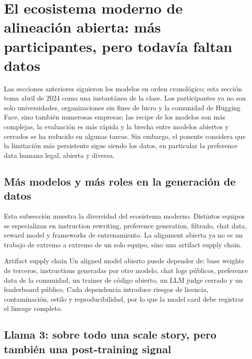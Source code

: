 \section{El ecosistema moderno de alineación abierta: más participantes, pero todavía faltan datos}

Las secciones anteriores siguieron los modelos en orden cronológico; esta sección toma abril de 2024 como una instantánea de la clase. Los participantes ya no son solo universidades, organizaciones sin fines de lucro y la comunidad de Hugging Face, sino también numerosas empresas; las recipe de los modelos son más complejas, la evaluación es más rápida y la brecha entre modelos abiertos y cerrados se ha reducido en algunas tareas. Sin embargo, el ponente considera que la limitación más persistente sigue siendo los datos, en particular la preference data humana legal, abierta y diversa.

\subsection{Más modelos y más roles en la generación de datos}

Esta subsección muestra la diversidad del ecosistema moderno. Distintos equipos se especializan en instruction rewriting, preference generation, filtrado, chat data, reward model y frameworks de entrenamiento. La alignment abierta ya no es un trabajo de extremo a extremo de un solo equipo, sino una artifact supply chain.


\begin{knowledgebox}{Artifact supply chain}
Un aligned model abierto puede depender de: base weights de terceros, instructions generadas por otro modelo, chat logs públicos, preference data de la comunidad, un trainer de código abierto, un LLM judge cerrado y un leaderboard público. Cada dependencia introduce riesgos de licencia, contaminación, estilo y reproducibilidad, por lo que la model card debe registrar el lineage completo.
\end{knowledgebox}

\subsection{Llama 3: sobre todo una scale story, pero también una post-training signal}

